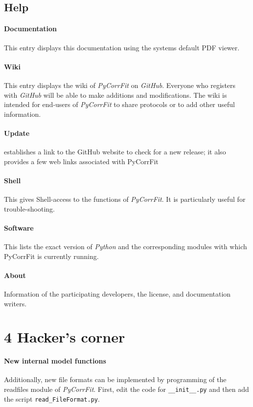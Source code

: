 \subsection{Help}
\paragraph*{Documentation}
This entry displays this documentation using the systems default PDF viewer.
\paragraph*{Wiki}
This entry displays the wiki of \textit{PyCorrFit} on \textit{GitHub}. Everyone who registers with \textit{GitHub} will be able to make additions and modifications. The wiki is intended for end-users of \textit{PyCorrFit} to share protocols or to add other useful information.
\paragraph*{Update}
establishes a link to the GitHub website to check for a new release; it also provides a few web links associated with PyCorrFit
\paragraph*{Shell}
This gives Shell-access to the functions of \textit{PyCorrFit}. It is particularly useful for trouble-shooting.
\paragraph*{Software}
This lists the exact version of \textit{Python} and the corresponding modules with which PyCorrFit is currently running.
\paragraph*{About}
Information of the participating developers, the license, and documentation writers.


\section{4 Hacker's corner}
\paragraph*{New internal model functions}
Additionally, new file formats can be implemented by programming of the readfiles module of \textit{PyCorrFit}. First, edit the code for \texttt{\_\_init\_\_.py} and then add the script \texttt{read\_FileFormat.py}.

